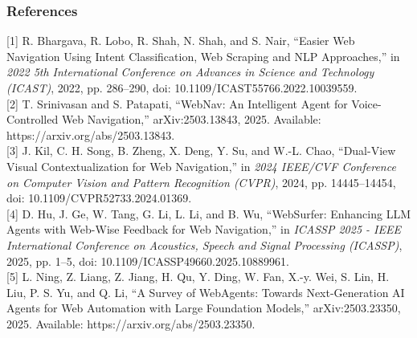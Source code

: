 \documentclass{beamer}
\begin{document}
\begin{frame}
\frametitle{References} 
\footnotesize{

[1] R. Bhargava, R. Lobo, R. Shah, N. Shah, and S. Nair, “Easier Web Navigation Using Intent Classification, Web Scraping and NLP Approaches,” in \textit{2022 5th International Conference on Advances in Science and Technology (ICAST)}, 2022, pp. 286–290, doi: 10.1109/ICAST55766.2022.10039559. \\

[2] T. Srinivasan and S. Patapati, “WebNav: An Intelligent Agent for Voice-Controlled Web Navigation,” arXiv:2503.13843, 2025. Available: https://arxiv.org/abs/2503.13843. \\

[3] J. Kil, C. H. Song, B. Zheng, X. Deng, Y. Su, and W.-L. Chao, “Dual-View Visual Contextualization for Web Navigation,” in \textit{2024 IEEE/CVF Conference on Computer Vision and Pattern Recognition (CVPR)}, 2024, pp. 14445–14454, doi: 10.1109/CVPR52733.2024.01369. \\

[4] D. Hu, J. Ge, W. Tang, G. Li, L. Li, and B. Wu, “WebSurfer: Enhancing LLM Agents with Web-Wise Feedback for Web Navigation,” in \textit{ICASSP 2025 - IEEE International Conference on Acoustics, Speech and Signal Processing (ICASSP)}, 2025, pp. 1–5, doi: 10.1109/ICASSP49660.2025.10889961. \\

[5] L. Ning, Z. Liang, Z. Jiang, H. Qu, Y. Ding, W. Fan, X.-y. Wei, S. Lin, H. Liu, P. S. Yu, and Q. Li, “A Survey of WebAgents: Towards Next-Generation AI Agents for Web Automation with Large Foundation Models,” arXiv:2503.23350, 2025. Available: https://arxiv.org/abs/2503.23350. \\

}
\end{frame}
\end{document}
